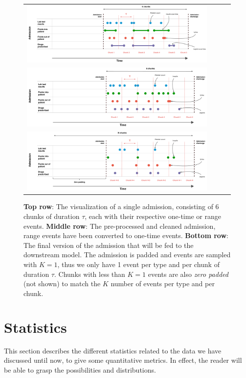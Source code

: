 \begin{figure}[H]
 \begin{tabularx}{\textwidth}{XXXX}
  \includegraphics{figures/adm-before.pdf} \\[1.2cm]
  \includegraphics{figures/adm-after-1.pdf} \\[1.2cm]
  \includegraphics{figures/adm-after-2.pdf}
 \end{tabularx}
 \caption{\textbf{Top row}: The visualization of a single admission, consisting of 6 chunks of duration $\tau$, each with their respective one-time or range events. \textbf{Middle row}: The pre-processed and cleaned admission, range events have been converted to one-time events. \textbf{Bottom row}: The final version of the admission that will be fed to the downstream model. The admission is padded and events are sampled with $K=1$, thus we only have 1 event per type and per chunk of duration $\tau$. Chunks with less than $K=1$ events are also \textit{zero padded} (not shown) to match the $K$ number of events per type and per chunk.}
\end{figure}

\newpage
\section{Statistics}
\label{sec:Statistics}
This section describes the different statistics related to the data we have discussed until now, to give some quantitative metrics. In effect, the reader will be able to grasp the possibilities and distributions.

